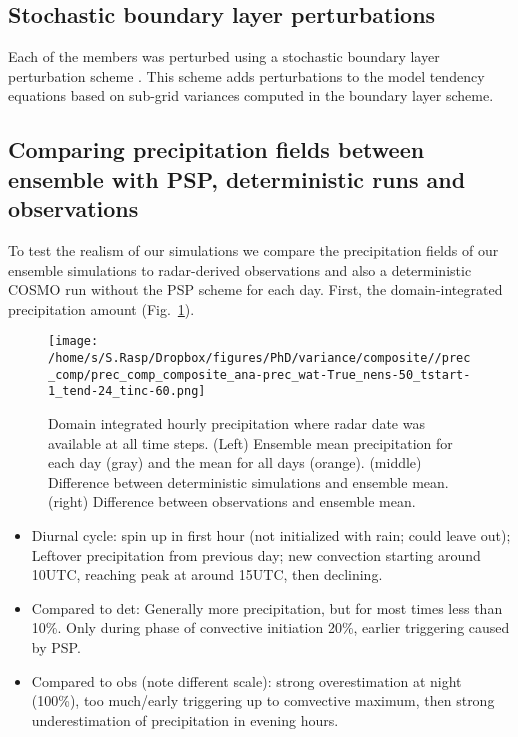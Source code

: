 \documentclass[a4paper, 12pt]{article}
\begin{document}
\subsection{Stochastic boundary layer perturbations}
Each of the members was perturbed using a stochastic boundary layer perturbation scheme \citep{Kober2016}. This scheme adds perturbations to the model tendency equations based on sub-grid variances computed in the boundary layer scheme. 

\newpage
\subsection{Comparing precipitation fields between ensemble with PSP, deterministic runs and observations}
To test the realism of our simulations we compare the precipitation fields of our ensemble simulations to radar-derived observations and also a deterministic COSMO run without the PSP scheme for each day. First, the domain-integrated precipitation amount (Fig.~\ref{fig:di_prec}). 
\begin{figure}[h!]
\noindent \centering
\texttt{[image: /home/s/S.Rasp/Dropbox/figures/PhD/variance/composite//prec\_comp/prec\_comp\_composite\_ana-prec\_wat-True\_nens-50\_tstart-1\_tend-24\_tinc-60.png]}\\
\caption{Domain integrated hourly precipitation where radar date was available at all time steps. (Left) Ensemble mean precipitation for each day (gray) and the mean for all days (orange). (middle) Difference between deterministic simulations and ensemble mean. (right) Difference between observations and ensemble mean.} \label{fig:di_prec}
\end{figure}
\begin{itemize}
 \item Diurnal cycle: spin up in first hour (not initialized with rain; could leave out); Leftover precipitation from previous day; new convection starting around 10UTC, reaching peak at around 15UTC, then declining.
 \item Compared to det: Generally more precipitation, but for most times less than 10\%. Only during phase of convective initiation 20\%, earlier triggering caused by PSP.
 \item Compared to obs (note different scale): strong overestimation at night (100\%), too much/early triggering up to comvective maximum, then strong underestimation of precipitation in evening hours.
\end{itemize}
\end{document}
